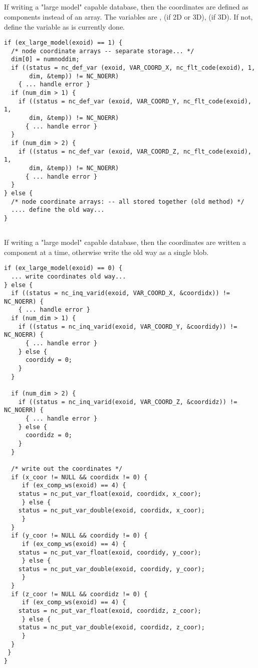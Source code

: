 \subsection{}
If writing a "large model" capable database, then the coordinates are
defined as components instead of an array. The variables are
,  (if 2D or 3D),
 (if 3D). If not, define the 
variable as is currently done.

\begin{lstlisting}
if (ex_large_model(exoid) == 1) {
  /* node coordinate arrays -- separate storage... */
  dim[0] = numnoddim;
  if ((status = nc_def_var (exoid, VAR_COORD_X, nc_flt_code(exoid), 1,
       dim, &temp)) != NC_NOERR)
    { ... handle error }
  if (num_dim > 1) {
    if ((status = nc_def_var (exoid, VAR_COORD_Y, nc_flt_code(exoid), 1,
       dim, &temp)) != NC_NOERR)
      { ... handle error }
  }
  if (num_dim > 2) {
    if ((status = nc_def_var (exoid, VAR_COORD_Z, nc_flt_code(exoid), 1,
       dim, &temp)) != NC_NOERR)
      { ... handle error }
  }
} else {
  /* node coordinate arrays: -- all stored together (old method) */
  .... define the old way...
}
\end{lstlisting}

\subsection{}
If writing a "large model" capable database, then the coordinates are
written a component at a time, otherwise write the old way as a single
blob.
\begin{lstlisting}
if (ex_large_model(exoid) == 0) {
  ... write coordinates old way...
} else {
  if ((status = nc_inq_varid(exoid, VAR_COORD_X, &coordidx)) != NC_NOERR) {
    { ... handle error }
  if (num_dim > 1) {
    if ((status = nc_inq_varid(exoid, VAR_COORD_Y, &coordidy)) != NC_NOERR) {
      { ... handle error }
    } else {
      coordidy = 0;
    }
  }

  if (num_dim > 2) {
    if ((status = nc_inq_varid(exoid, VAR_COORD_Z, &coordidz)) != NC_NOERR) {
      { ... handle error }
    } else {
      coordidz = 0;
    }
  }

  /* write out the coordinates */
  if (x_coor != NULL && coordidx != 0) {
     if (ex_comp_ws(exoid) == 4) {
	status = nc_put_var_float(exoid, coordidx, x_coor);
     } else {
	status = nc_put_var_double(exoid, coordidx, x_coor);
     }
  }
  if (y_coor != NULL && coordidy != 0) {
     if (ex_comp_ws(exoid) == 4) {
	status = nc_put_var_float(exoid, coordidy, y_coor);
     } else {
	status = nc_put_var_double(exoid, coordidy, y_coor);
     }
  }
  if (z_coor != NULL && coordidz != 0) {
     if (ex_comp_ws(exoid) == 4) {
	status = nc_put_var_float(exoid, coordidz, z_coor);
     } else {
	status = nc_put_var_double(exoid, coordidz, z_coor);
     }
  }
 }
}
\end{lstlisting}

